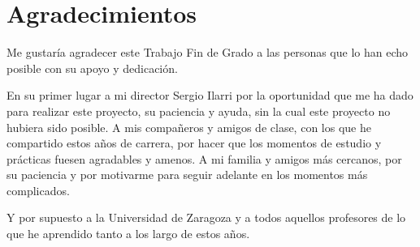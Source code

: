 \cleardoublepage


\thispagestyle{empty}


\chapter*{Agradecimientos}
\thispagestyle{empty}

       \vspace{1cm}


Me gustaría agradecer este Trabajo Fin de Grado a las personas que lo han echo posible con su apoyo y dedicación.

\vspace{1cm}
En su primer lugar a mi director Sergio Ilarri por la oportunidad que me ha dado para realizar este proyecto, su paciencia y ayuda, sin la cual este proyecto no hubiera sido posible. A mis compañeros y amigos de clase, con los que he compartido estos años de carrera, por hacer que los momentos de estudio y prácticas fuesen agradables y amenos. A mi familia y amigos más cercanos, por su paciencia y por motivarme para seguir adelante en los momentos más complicados.

\vspace{1cm}
Y por supuesto a la Universidad de Zaragoza y a todos aquellos profesores de lo que he aprendido tanto a los largo de estos años.

\cleardoublepage
